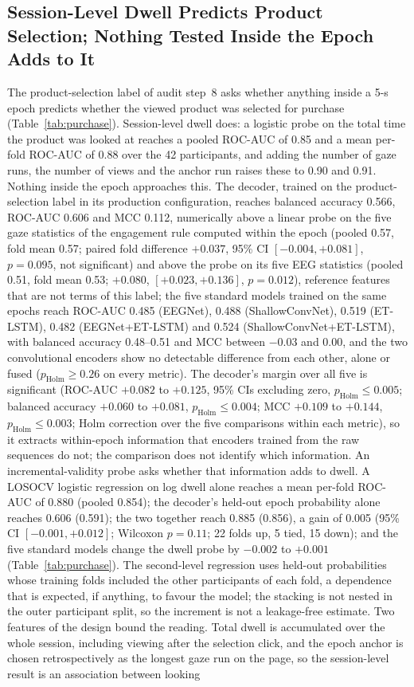 \documentclass[pdflatex,sn-basic,Numbered,twocolumn,iicol]{sn-jnl}
\theoremstyle{thmstyleone}%
\theoremstyle{thmstyletwo}%
\theoremstyle{thmstylethree}%
\begin{document}
\subsection{Session-Level Dwell Predicts Product Selection; Nothing Tested Inside the Epoch Adds to It}\label{res:rq4}

The product-selection label of audit step~8 asks whether anything inside a 5-s epoch predicts whether the viewed product was selected for purchase (Table~\ref{tab:purchase}). Session-level dwell does: a logistic probe on the total time the product was looked at reaches a pooled ROC-AUC of 0.85 and a mean per-fold ROC-AUC of 0.88 over the 42 participants, and adding the number of gaze runs, the number of views and the anchor run raises these to 0.90 and 0.91. Nothing inside the epoch approaches this. The decoder, trained on the product-selection label in its production configuration, reaches balanced accuracy 0.566, ROC-AUC 0.606 and MCC 0.112, numerically above a linear probe on the five gaze statistics of the engagement rule computed within the epoch (pooled 0.57, fold mean 0.57; paired fold difference $+0.037$, 95\% CI $[-0.004, +0.081]$, $p=0.095$, not significant) and above the probe on its five EEG statistics (pooled 0.51, fold mean 0.53; $+0.080$, $[+0.023, +0.136]$, $p=0.012$), reference features that are not terms of this label; the five standard models trained on the same epochs reach ROC-AUC 0.485 (EEGNet), 0.488 (ShallowConvNet), 0.519 (ET-LSTM), 0.482 (EEGNet+ET-LSTM) and 0.524 (ShallowConvNet+ET-LSTM), with balanced accuracy 0.48--0.51 and MCC between $-0.03$ and $0.00$, and the two convolutional encoders show no detectable difference from each other, alone or fused ($p_{\mathrm{Holm}}\ge0.26$ on every metric). The decoder's margin over all five is significant (ROC-AUC $+0.082$ to $+0.125$, 95\% CIs excluding zero, $p_{\mathrm{Holm}}\le0.005$; balanced accuracy $+0.060$ to $+0.081$, $p_{\mathrm{Holm}}\le0.004$; MCC $+0.109$ to $+0.144$, $p_{\mathrm{Holm}}\le0.003$; Holm correction over the five comparisons within each metric), so it extracts within-epoch information that encoders trained from the raw sequences do not; the comparison does not identify which information. An incremental-validity probe asks whether that information adds to dwell. A LOSOCV logistic regression on log dwell alone reaches a mean per-fold ROC-AUC of 0.880 (pooled 0.854); the decoder's held-out epoch probability alone reaches 0.606 (0.591); the two together reach 0.885 (0.856), a gain of 0.005 (95\% CI $[-0.001, +0.012]$; Wilcoxon $p=0.11$; 22 folds up, 5 tied, 15 down); and the five standard models change the dwell probe by $-0.002$ to $+0.001$ (Table~\ref{tab:purchase}). The second-level regression uses held-out probabilities whose training folds included the other participants of each fold, a dependence that is expected, if anything, to favour the model; the stacking is not nested in the outer participant split, so the increment is not a leakage-free estimate. Two features of the design bound the reading. Total dwell is accumulated over the whole session, including viewing after the selection click, and the epoch anchor is chosen retrospectively as the longest gaze run on the page, so the session-level result is an association between looking 
\end{document}
